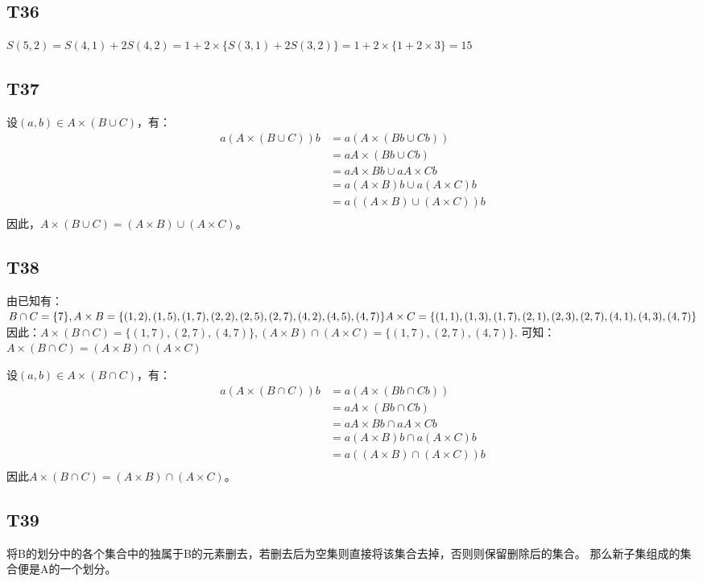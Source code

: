\documentclass{article}
\begin{document}
\subsection{T36}
$S(5 ,2) = S(4, 1) + 2S(4, 2) = 1 + 2 \times \{S(3, 1) + 2S(3, 2)\} = 1 + 2 \times \{1 + 2 \times 3\} = 15$
\subsection{T37}
设$(a, b) \in A \times (B \cup C)$，有：
\begin{align*}
    a(A \times (B \cup C))b &= a(A \times (Bb \cup Cb))\\
    &= aA \times (Bb \cup Cb)\\
    &= aA \times Bb \cup aA \times Cb\\
    &= a(A \times B)b \cup a(A \times C)b\\
    &= a((A \times B) \cup (A \times C))b\\
\end{align*}
因此，$A\times (B \cup C) = (A \times B) \cup (A \times C)$。
\subsection{T38}
由已知有：$B \cap C = \{7\}, A \times B = \{(1, 2), (1, 5), (1, 7), (2, 2), (2, 5), (2, 7), 
(4, 2), (4, 5), (4, 7)\}\\ 
A \times C = \{(1, 1), (1, 3), (1, 7), (2, 1), (2, 3), (2, 7), (4, 1), (4 ,3), (4, 7)\}$\\
因此：$A \times (B \cap C) = \{(1, 7), (2, 7), (4, 7)\}, (A \times B) \cap (A \times C) = \{(1, 7), (2, 7), (4, 7)\}$.
可知：$A \times (B \cap C) = (A \times B) \cap (A \times C)$

设$(a, b) \in A \times (B \cap C)$，有：
\begin{align*}
    a(A \times (B \cap C))b &= a(A \times (Bb \cap Cb))\\
    &= aA \times (Bb \cap Cb)\\
    &= aA \times Bb \cap aA \times Cb\\
    &= a(A \times B)b \cap a(A \times C)b\\
    &= a((A \times B) \cap (A \times C))b\\
\end{align*}
因此$A \times (B \cap C) = (A \times B) \cap (A \times C)$。
\subsection{T39}
将B的划分中的各个集合中的独属于B的元素删去，若删去后为空集则直接将该集合去掉，否则则保留删除后的集合。
那么新子集组成的集合便是A的一个划分。
\end{document}
